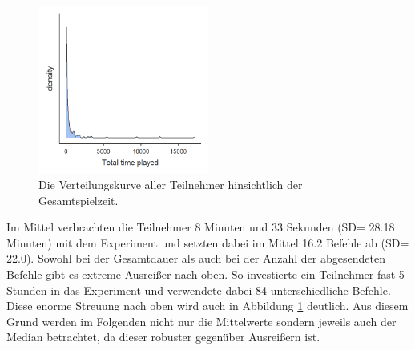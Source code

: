 \begin{figure}[htbp]
    \centering
    \includegraphics[width=0.5\textwidth]{img/auswertung/density.png}
    \caption{Die Verteilungskurve aller Teilnehmer hinsichtlich der Gesamtspielzeit.}
    \label{density}
\end{figure}

Im Mittel verbrachten die Teilnehmer 8 Minuten und 33 Sekunden (SD= 28.18 Minuten) mit dem Experiment und setzten dabei im Mittel 16.2 Befehle ab (SD= 22.0). Sowohl bei der Gesamtdauer als auch bei der Anzahl der abgesendeten Befehle gibt es extreme Ausreißer nach oben. So investierte ein Teilnehmer fast 5 Stunden in das Experiment und verwendete dabei 84 unterschiedliche Befehle. Diese enorme Streuung nach oben wird auch in Abbildung \ref{density} deutlich. Aus diesem Grund werden im Folgenden nicht nur die Mittelwerte sondern jeweils auch der Median betrachtet, da dieser robuster gegenüber Ausreißern ist.

